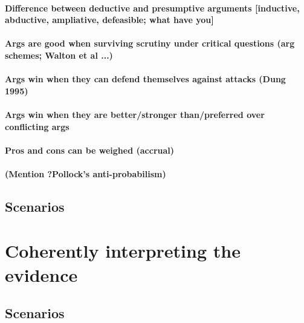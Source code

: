 \documentclass[10pt]{article}
\begin{document}
\paragraph{Difference between deductive and presumptive arguments [inductive, abductive, ampliative, defeasible; what have you]}

\paragraph{Args are good when surviving scrutiny under critical questions (arg schemes; Walton et al ...)}

\paragraph{Args win when they can defend themselves against attacks (Dung 1995)}

\paragraph{Args win when they are better/stronger than/preferred over conflicting args}

\paragraph{Pros and cons can be weighed (accrual)}

\paragraph{(Mention ?Pollock's anti-probabilism)}

\subsection{Scenarios}


\section{Coherently interpreting the evidence}

\subsection{Scenarios}
\end{document}
